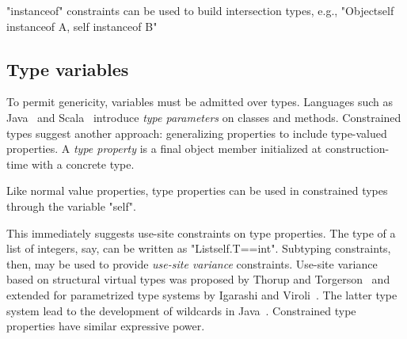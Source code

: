 \xcd"instanceof" constraints can be used to build intersection
types, e.g., \xcd"Object{self instanceof A, self instanceof B}"

\subsection{Type variables}
\label{sec:type-properties}
\label{sec:variance}

To permit genericity, variables  must be admitted over types.
Languages such as Java~\cite{Java3} and
Scala~\cite{scala} introduce \emph{type parameters} on classes
and methods.
Constrained types suggest another approach:
generalizing properties to include type-valued properties.
A \emph{type property}
is a final object member initialized at construction-time with a
concrete type.  

\label{sec:usability}
\label{sec:parameters-vs-fields}

Like normal value properties, type properties
can be used in constrained types through the variable \xcd"self".

This immediately suggests use-site constraints on type
properties.
The type of a list of integers, say, can be written as
\xcd"List{self.T==int}".  
Subtyping constraints, then, may be used to
provide \emph{use-site variance} constraints.
Use-site variance based on structural virtual types was proposed by
Thorup and Torgerson~\cite{unifying-genericity} and extended for
parametrized type systems by Igarashi and
Viroli~\cite{variant-parametric-types}.  The latter type system lead
to the development of wildcards in
Java~\cite{Java3,adding-wildcards,wildcards-safe}.  Constrained
type properties
have similar expressive power.

